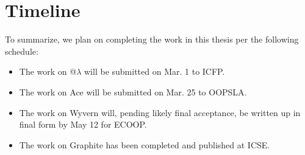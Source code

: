 \section{Timeline}
To summarize, we plan on completing the work in this thesis per the following schedule:
\begin{itemize}
\item The work on @$\lambda$ will be submitted on Mar. 1 to ICFP. 
\item The work on Ace will be submitted on Mar. 25 to OOPSLA.
\item The work on Wyvern will, pending likely final acceptance, be written up in final form by May 12 for ECOOP.
\item The work on Graphite has been completed and published at ICSE.
\end{itemize}

